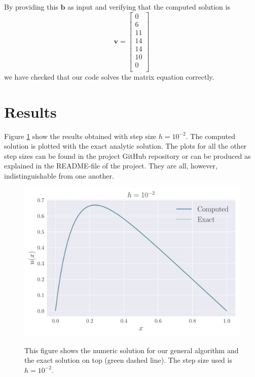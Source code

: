 \documentclass[reprint, english,notitlepage]{revtex4-1}  %
\begin{document}
By providing this $\boldsymbol b$ as input and verifying that the computed solution is
\begin{equation*}
  \boldsymbol v
=
\begin{bmatrix}
0 \\
6 \\
11 \\
14  \\
14  \\
10  \\
0 \\
\end{bmatrix}
\end{equation*}
we have checked that our code solves the matrix equation correctly.



\section{Results}

Figure \ref{fig:slow_2} show the results obtained with step size $h = 10^{-2}$. The computed solution is plotted with the exact analytic solution. The plots for all the other step sizes can be found in the project GitHub repository \citep{github} or can be produced as explained in the README-file of the project. They are all, however, indistinguishable from one another.

\begin{figure}[h]
	\centering
	\includegraphics[scale=0.44]{../output/slow_2.pdf}
	\label{fig:slow_2}
	\caption{This figure shows the numeric solution for our general algorithm and the exact solution on top (green dashed line). The step size used is $h=10^{-2}$.}
\end{figure}
\end{document}
